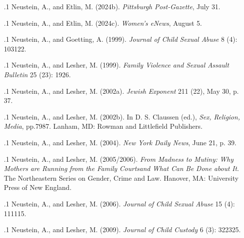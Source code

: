 \documentclass[11pt, twoside]{article}
\begin{document}
{\p.1{%
Neustein, A., and Etlin, M. (2024b).  \textit{Pittsburgh Post-Gazette}, July 31.
}%

\p.1{%
Neustein, A., and Etlin, M. (2024c).  \textit{Women’s eNews}, August 5.
}%

\p.1{%
Neustein, A., and Goetting, A. (1999).  \textit{Journal of Child Sexual Abuse} 8 (4):
103\ndash{}122.
}%

\p.1{%
Neustein, A., and Lesher, M. (1999).  \textit{Family Violence and Sexual Assault Bulletin} 25 (2\ndash{}3): 19\ndash{}26.
}%

\p.1{%
Neustein, A., and Lesher, M. (2002a).  \textit{Jewish Exponent} 211 (22), May 30, p. 37.
}%

\p.1{%
Neustein, A., and Lesher, M. (2002b).  In D. S. Claussen (ed.),
\textit{Sex, Religion, Media}, pp.\@ 79\ndash{}87. Lanham, MD: Rowman and Littlefield Publishers.
}%

\p.1{%
Neustein, A., and Lesher, M. (2004).  \textit{New York Daily News}, June 21, p. 39.
}%

\p.1{%
Neustein, A., and Lesher, M. (2005/2006). \textit{From Madness to Mutiny: Why Mothers are
Running from the Family Courts\mdash{}and What Can Be Done about It}. The
Northeastern Series on Gender, Crime and Law. Hanover, MA: University Press of New
England.
}%

\p.1{%
Neustein, A., and Lesher, M. (2006).  \textit{Journal of Child Sexual Abuse} 15 (4): 111\ndash{}115.
}%

\p.1{%
Neustein, A., and Lesher, M. (2009).  \textit{Journal of Child Custody}
6 (3): 322\ndash{}325.
}%

}
\end{document}

